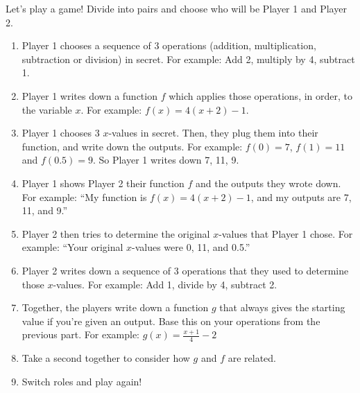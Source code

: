\documentclass[noauthor]{ximera}
\begin{document}
\begin{problem}
Let's play a game! Divide into pairs and choose who will be
Player 1 and Player 2. 

\begin{enumerate}
    \item Player 1 chooses a sequence of 3 operations (addition, 
    multiplication, subtraction or division) in secret. For example: Add 2, multiply by 4, subtract 1.
    \item Player 1 writes down a function \(f\) which applies those operations,
    in order, to the variable \(x\). For example: \(f(x) = 4(x + 2) - 1\).
    \item Player 1 chooses 3 \(x\)-values in secret. Then, they plug them into their function,
    and write down the outputs. For example: \(f(0) = 7\), \(f(1) = 11\) and \(f(0.5) = 9\). So Player 1
        writes down 7, 11, 9.
    \item Player 1 shows Player 2 their function \(f\) and the outputs they wrote down.
    For example: ``My function is \(f(x) = 4(x + 2) - 1\), and my outputs are 7, 11, and 9.''
    \item Player 2 then tries to determine the original \(x\)-values that
    Player 1 chose. For example: ``Your original \(x\)-values were 0, 11, and 0.5.''
    \item Player 2 writes down a sequence of 3 operations that they
    used to determine those \(x\)-values. For example: Add 1, divide by 4, subtract 2.
    \item Together, the players write down a function \(g\) that always gives the 
    starting value if you're given an output. Base this on your operations
    from the previous part. For example: \(g(x) = \frac{x + 1}{4} - 2\)
    \item Take a second together to consider how \(g\) and \(f\) are related. 
    \item Switch roles and play again!
\end{enumerate}
\end{problem}
\end{document}
